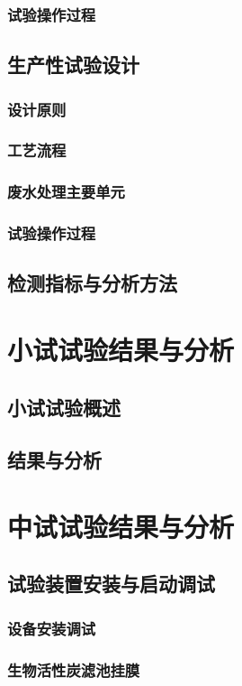 \subsubsection{试验操作过程}
\lipsum
\subsection{生产性试验设计}
\subsubsection{设计原则}
\lipsum
\subsubsection{工艺流程}
\lipsum
\subsubsection{废水处理主要单元}
\lipsum
\subsubsection{试验操作过程}
\lipsum
\subsection{检测指标与分析方法}
\lipsum
{\centering\section{小试试验结果与分析}}
\subsection{小试试验概述}
\lipsum
\subsection{结果与分析}
\lipsum
{\centering\section{中试试验结果与分析}}
\subsection{试验装置安装与启动调试}
\subsubsection{设备安装调试}
\lipsum
\subsubsection{生物活性炭滤池挂膜}
\lipsum

